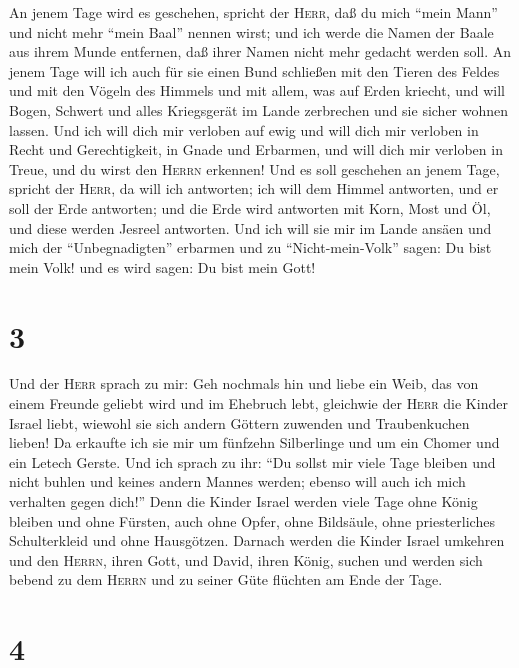  An jenem Tage wird es geschehen, spricht der
\textsc{Herr}, daß du mich ``mein Mann'' und nicht mehr ``mein Baal''
nennen wirst;  und ich werde die Namen der Baale aus
ihrem Munde entfernen, daß ihrer Namen nicht mehr gedacht werden soll.
 An jenem Tage will ich auch für sie einen Bund schließen
mit den Tieren des Feldes und mit den Vögeln des Himmels und mit allem,
was auf Erden kriecht, und will Bogen, Schwert und alles Kriegsgerät im
Lande zerbrechen und sie sicher wohnen lassen.  Und ich
will dich mir verloben auf ewig und will dich mir verloben in Recht und
Gerechtigkeit, in Gnade und Erbarmen,  und will dich mir
verloben in Treue, und du wirst den \textsc{Herrn} erkennen!
 Und es soll geschehen an jenem Tage, spricht der
\textsc{Herr}, da will ich antworten; ich will dem Himmel antworten, und
er soll der Erde antworten;  und die Erde wird antworten
mit Korn, Most und Öl, und diese werden Jesreel antworten.
 Und ich will sie mir im Lande ansäen und mich der
``Unbegnadigten'' erbarmen und zu ``Nicht-mein-Volk'' sagen: Du bist
mein Volk! und es wird sagen: Du bist mein Gott!

\hypertarget{section-2}{%
\section{3}\label{section-2}}

 Und der \textsc{Herr} sprach zu mir: Geh nochmals hin und
liebe ein Weib, das von einem Freunde geliebt wird und im Ehebruch lebt,
gleichwie der \textsc{Herr} die Kinder Israel liebt, wiewohl sie sich
andern Göttern zuwenden und Traubenkuchen lieben!  Da
erkaufte ich sie mir um fünfzehn Silberlinge und um ein Chomer und ein
Letech Gerste.  Und ich sprach zu ihr: ``Du sollst mir
viele Tage bleiben und nicht buhlen und keines andern Mannes werden;
ebenso will auch ich mich verhalten gegen dich!''  Denn
die Kinder Israel werden viele Tage ohne König bleiben und ohne Fürsten,
auch ohne Opfer, ohne Bildsäule, ohne priesterliches Schulterkleid und
ohne Hausgötzen.  Darnach werden die Kinder Israel
umkehren und den \textsc{Herrn}, ihren Gott, und David, ihren König,
suchen und werden sich bebend zu dem \textsc{Herrn} und zu seiner Güte
flüchten am Ende der Tage.

\hypertarget{section-3}{%
\section{4}\label{section-3}}


